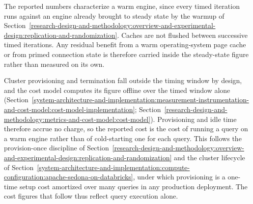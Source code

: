 The reported numbers characterize a warm engine, since every timed iteration runs against an engine already brought to steady state by the warmup of Section~\ref{research-design-and-methodology:overview-and-experimental-design:replication-and-randomization}. Caches are not flushed between successive timed iterations. Any residual benefit from a warm operating-system page cache or from primed connection state is therefore carried inside the steady-state figure rather than measured on its own.

Cluster provisioning and termination fall outside the timing window by design, and the cost model computes its figure offline over the timed window alone (Section~\ref{system-architecture-and-implementation:measurement-instrumentation-and-cost-model:cost-model-implementation}; Section~\ref{research-design-and-methodology:metrics-and-cost-model:cost-model}). Provisioning and idle time therefore accrue no charge, so the reported cost is the cost of running a query on a warm engine rather than of cold-starting one for each query. This follows the provision-once discipline of Section~\ref{research-design-and-methodology:overview-and-experimental-design:replication-and-randomization} and the cluster lifecycle of Section~\ref{system-architecture-and-implementation:compute-configuration:apache-sedona-on-databricks}, under which provisioning is a one-time setup cost amortized over many queries in any production deployment. The cost figures that follow thus reflect query execution alone.